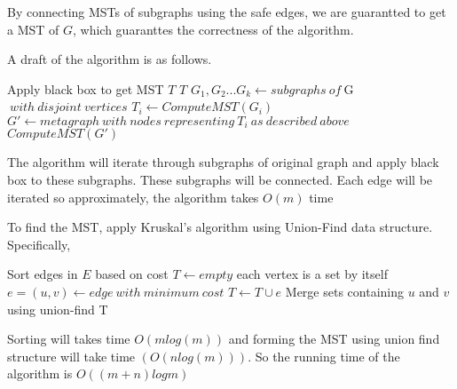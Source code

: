 \documentclass[12pt,a4paper]{article}
\newcommand{\question}[1]{\bigskip\noindent{\textbf{Q{#1} solution}}}
\begin{document}
By connecting MSTs of subgraphs using the safe edges, we are guarantted to get a MST of $G$, which guaranttes the correctness of the algorithm.

A draft of the algorithm is as follows. 


\begin{algorithm}
  \begin{algorithmic}
        \State Apply black box to get MST $T$
        \State \Return $T$
      \EndIf
      \State $G_1,G_2...G_k \gets subgraphs\ of\ $G$\ with\ disjoint\ vertices$
        \State $T_i \gets ComputeMST(G_i)$
      \EndFor
      \State $G' \gets metagraph\ with\ nodes\ representing\ T_i\ as\ described\ above$
      \State \Return $ComputeMST(G')$
    \EndFunction
  \end{algorithmic}
\end{algorithm}

The algorithm will iterate through subgraphs of original graph and apply black box to these subgraphs. These subgraphs will be connected. Each edge will be iterated so approximately, the algorithm takes $O(m)$ time


\question{29.C}

To find the MST, apply Kruskal's algorithm using Union-Find data structure. Specifically, 

\begin{algorithm}
  \begin{algorithmic}
    \State Sort edges in $E$ based on cost 
    \State $T \gets empty$
    \State each vertex is a set by itself
      \State $e = (u,v) \gets edge\ with\ minimum\ cost$
        \State $T \gets T \cup e$
        \State Merge sets containing $u$ and $v$ using union-find
      \EndIf
    \EndWhile
    \State \Return T
    \EndFunction
  \end{algorithmic}
\end{algorithm}

Sorting will takes time $O(mlog(m))$ and forming the MST using union find structure will take time $(O(nlog(m)))$. So the running time of the algorithm is $O((m+n)logm)$
\end{document}
